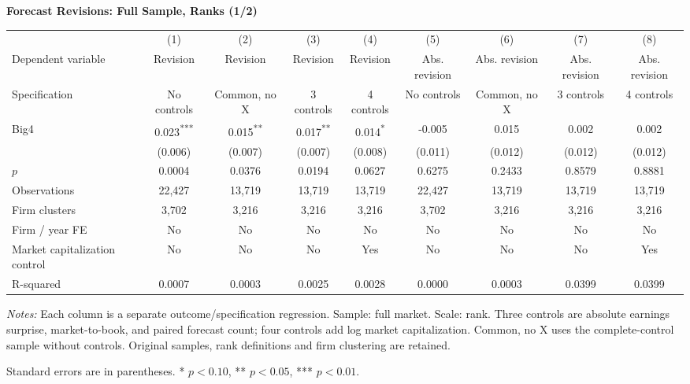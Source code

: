 \documentclass[10pt]{article}
\newcommand{\sym}[1]{\textsuperscript{#1}}
\begin{document}
\begin{minipage}{28.80cm}
\fontsize{10}{12}\selectfont
\setlength{\tabcolsep}{4pt}\renewcommand{\arraystretch}{1.08}
{\large\bfseries Forecast Revisions: Full Sample, Ranks (1/2)}\par\medskip
\begin{tabular*}{\linewidth}{@{\extracolsep{\fill}}lcccccccc@{}}
\toprule
 & (1) & (2) & (3) & (4) & (5) & (6) & (7) & (8) \\
Dependent variable & Revision & Revision & Revision & Revision & Abs. revision & Abs. revision & Abs. revision & Abs. revision \\
Specification & No controls & Common, no X & 3 controls & 4 controls & No controls & Common, no X & 3 controls & 4 controls \\
\midrule
Big4 & 0.023\sym{***} & 0.015\sym{**} & 0.017\sym{**} & 0.014\sym{*} & -0.005 & 0.015 & 0.002 & 0.002 \\
 & (0.006) & (0.007) & (0.007) & (0.008) & (0.011) & (0.012) & (0.012) & (0.012) \\
$p$ & 0.0004 & 0.0376 & 0.0194 & 0.0627 & 0.6275 & 0.2433 & 0.8579 & 0.8881 \\
\midrule
Observations & 22,427 & 13,719 & 13,719 & 13,719 & 22,427 & 13,719 & 13,719 & 13,719 \\
Firm clusters & 3,702 & 3,216 & 3,216 & 3,216 & 3,702 & 3,216 & 3,216 & 3,216 \\
Firm / year FE & No & No & No & No & No & No & No & No \\
Market capitalization control & No & No & No & Yes & No & No & No & Yes \\
R-squared & 0.0007 & 0.0003 & 0.0025 & 0.0028 & 0.0000 & 0.0003 & 0.0399 & 0.0399 \\
\bottomrule\end{tabular*}\par\medskip
\fontsize{9}{11}\selectfont\textit{Notes:} Each column is a separate outcome/specification regression. Sample: full market. Scale: rank. Three controls are absolute earnings surprise, market-to-book, and paired forecast count; four controls add log market capitalization. Common, no X uses the complete-control sample without controls. Original samples, rank definitions and firm clustering are retained.
\par Standard errors are in parentheses. * $p<0.10$, ** $p<0.05$, *** $p<0.01$.
\end{minipage}
\end{document}
